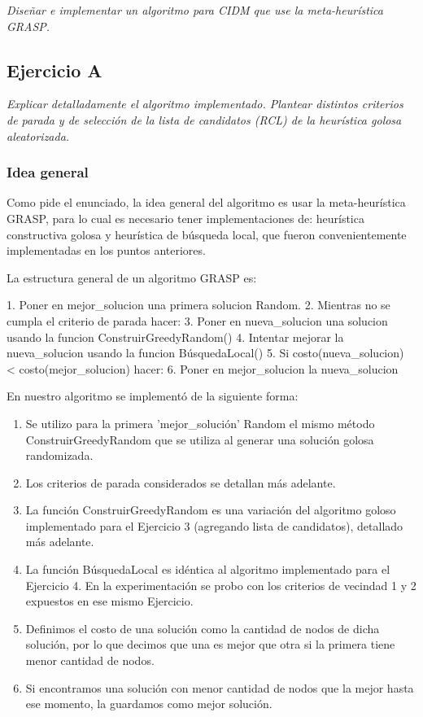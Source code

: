 \textit{Diseñar e implementar un algoritmo para CIDM que use la meta-heurística GRASP.}

\subsection{Ejercicio A}

\textit{Explicar detalladamente el algoritmo implementado. Plantear distintos criterios de parada y de selección de la lista de candidatos (RCL) de la heurística golosa aleatorizada.}

\medskip

\subsubsection{Idea general}

Como pide el enunciado, la idea general del algoritmo es usar la meta-heurística GRASP, para lo cual es necesario tener implementaciones de: heurística constructiva golosa y heurística de búsqueda local, que fueron convenientemente implementadas en los puntos anteriores.

La estructura general de un algoritmo GRASP es:

\begin{codesnippet}
1. Poner en mejor_solucion una primera solucion Random.
2. Mientras no se cumpla el criterio de parada hacer:
3.     Poner en nueva_solucion una solucion usando la funcion ConstruirGreedyRandom()
4.     Intentar mejorar la nueva_solucion usando la funcion BúsquedaLocal()
5.     Si costo(nueva_solucion) < costo(mejor_solucion) hacer:
6.         Poner en mejor_solucion la nueva_solucion
\end{codesnippet}

En nuestro algoritmo se implementó de la siguiente forma:
\begin{enumerate}
    \item Se utilizo para la primera 'mejor_solución' Random el mismo método ConstruirGreedyRandom que se utiliza al generar una solución golosa randomizada.
    \item Los criterios de parada considerados se detallan más adelante.
    \item La función ConstruirGreedyRandom es una variación del algoritmo goloso implementado para el Ejercicio 3 (agregando lista de candidatos), detallado más adelante.
    \item La función BúsquedaLocal es idéntica al algoritmo implementado para el Ejercicio 4. En la experimentación se probo con los criterios de vecindad 1 y 2 expuestos en ese mismo Ejercicio.
    \item Definimos el costo de una solución como la cantidad de nodos de dicha solución, por lo que decimos que una es mejor que otra si la primera tiene menor cantidad de nodos.
    \item Si encontramos una solución con menor cantidad de nodos que la mejor hasta ese momento, la guardamos como mejor solución.
\end{enumerate}


